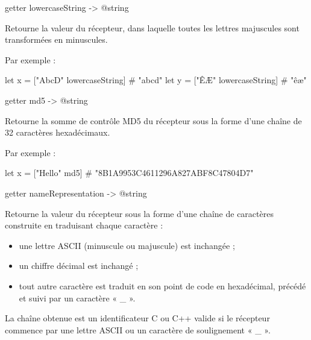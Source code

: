 
\begin{galgasbox}
getter lowercaseString -> @string
\end{galgasbox}

Retourne la valeur du récepteur, dans laquelle toutes les lettres majuscules sont transformées en minuscules.

Par exemple :
\begin{galgas}
let x = ["AbcD" lowercaseString] # "abcd"
let y = ["ÊÆ" lowercaseString] # "êæ"
\end{galgas}








\begin{galgasbox}
getter md5 -> @string
\end{galgasbox}

Retourne la somme de contrôle MD5 du récepteur sous la forme d'une chaîne de 32 caractères hexadécimaux.

Par exemple :
\begin{galgas}
let x = ["Hello" md5] # "8B1A9953C4611296A827ABF8C47804D7"
\end{galgas}








\begin{galgasbox}
getter nameRepresentation -> @string
\end{galgasbox}

Retourne la valeur du récepteur sous la forme d'une chaîne de caractères construite en traduisant chaque caractère :
\begin{itemize}
\item une lettre ASCII (minuscule ou majuscule) est inchangée ;
\item un chiffre décimal est inchangé ;
\item tout autre caractère est traduit en son point de code en hexadécimal, précédé et suivi par un caractère « \_ ».
\end{itemize}

La chaîne obtenue est un identificateur C ou C++ valide si le récepteur commence par une lettre ASCII ou un caractère de soulignement « \_ ».

